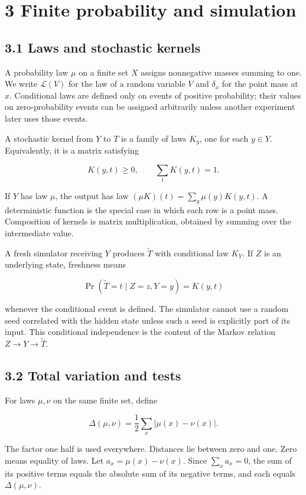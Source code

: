 \documentclass[
]{article}
\begin{document}
\section{3 Finite probability and
simulation}\label{finite-probability-and-simulation}

\subsection{3.1 Laws and stochastic
kernels}\label{laws-and-stochastic-kernels}

A probability law \(\mu\) on a finite set \(X\) assigns nonnegative
masses summing to one. We write \(\mathcal L(V)\) for the law of a
random variable \(V\) and \(\delta_x\) for the point mass at \(x\).
Conditional laws are defined only on events of positive probability;
their values on zero-probability events can be assigned arbitrarily
unless another experiment later uses those events.

A stochastic kernel from \(Y\) to \(T\) is a family of laws \(K_y\), one
for each \(y\in Y\). Equivalently, it is a matrix satisfying

\[
K(y,t)\ge0,\qquad \sum_tK(y,t)=1.
\]

If \(Y\) has law \(\mu\), the output has law
\((\mu K)(t)=\sum_y\mu(y)K(y,t)\). A deterministic function is the
special case in which each row is a point mass. Composition of kernels
is matrix multiplication, obtained by summing over the intermediate
value.

A fresh simulator receiving \(Y\) produces \(\widetilde T\) with
conditional law \(K_Y\). If \(Z\) is an underlying state, freshness
means

\[
\Pr(\widetilde T=t\mid Z=z,Y=y)=K(y,t)
\]

whenever the conditional event is defined. The simulator cannot use a
random seed correlated with the hidden state unless such a seed is
explicitly part of its input. This conditional independence is the
content of the Markov relation \(Z\to Y\to\widetilde T\).

\subsection{3.2 Total variation and
tests}\label{total-variation-and-tests}

For laws \(\mu,\nu\) on the same finite set, define

\[
\Delta(\mu,\nu)=\frac12\sum_x|\mu(x)-\nu(x)|.
\]

The factor one half is used everywhere. Distances lie between zero and
one. Zero means equality of laws. Let \(a_x=\mu(x)-\nu(x)\). Since
\(\sum_xa_x=0\), the sum of its positive terms equals the absolute sum
of its negative terms, and each equals \(\Delta(\mu,\nu)\).
\end{document}
